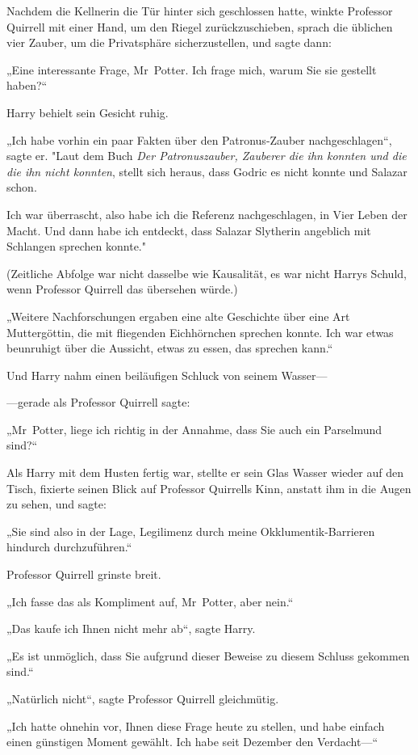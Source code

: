 {Nachdem die Kellnerin die Tür hinter sich geschlossen hatte, winkte Professor Quirrell mit einer Hand, um den Riegel zurückzuschieben, sprach die üblichen vier Zauber, um die Privatsphäre sicherzustellen, und sagte dann:

„Eine interessante Frage, Mr~Potter. Ich frage mich, warum Sie sie gestellt haben?“

Harry behielt sein Gesicht ruhig.

„Ich habe vorhin ein paar Fakten über den Patronus-Zauber nachgeschlagen“, sagte er. "Laut dem Buch \emph{Der Patronuszauber, Zauberer die ihn konnten und die die ihn nicht konnten}, stellt sich heraus, dass Godric es nicht konnte und Salazar schon.

Ich war überrascht, also habe ich die Referenz nachgeschlagen, in Vier Leben der Macht. Und dann habe ich entdeckt, dass Salazar Slytherin angeblich mit Schlangen sprechen konnte."

(Zeitliche Abfolge war nicht dasselbe wie Kausalität, es war nicht Harrys Schuld, wenn Professor Quirrell das übersehen würde.)

„Weitere Nachforschungen ergaben eine alte Geschichte über eine Art Muttergöttin, die mit fliegenden Eichhörnchen sprechen konnte. Ich war etwas beunruhigt über die Aussicht, etwas zu essen, das sprechen kann.“

Und Harry nahm einen beiläufigen Schluck von seinem Wasser—

—gerade als Professor Quirrell sagte:

„Mr~Potter, liege ich richtig in der Annahme, dass Sie auch ein Parselmund sind?“

Als Harry mit dem Husten fertig war, stellte er sein Glas Wasser wieder auf den Tisch, fixierte seinen Blick auf Professor Quirrells Kinn, anstatt ihm in die Augen zu sehen, und sagte:

„Sie sind also in der Lage, Legilimenz durch meine Okklumentik-Barrieren hindurch durchzuführen.“

Professor Quirrell grinste breit.

„Ich fasse das als Kompliment auf, Mr~Potter, aber nein.“

„Das kaufe ich Ihnen nicht mehr ab“, sagte Harry.

„Es ist unmöglich, dass Sie aufgrund dieser Beweise zu diesem Schluss gekommen sind.“

„Natürlich nicht“, sagte Professor Quirrell gleichmütig.

„Ich hatte ohnehin vor, Ihnen diese Frage heute zu stellen, und habe einfach einen günstigen Moment gewählt. Ich habe seit Dezember den Verdacht—“

}
